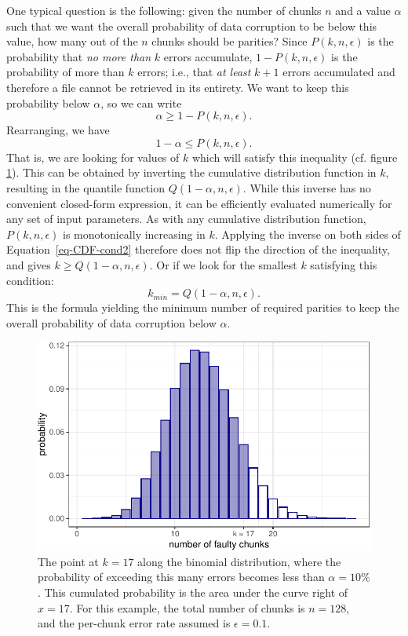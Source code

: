 \documentclass[manuscript,screen,review]{acmart}
\begin{document}
One typical question is the following: given the number of chunks $n$ and a value $\alpha$ such that we want the overall probability of data corruption to be below this value, how many out of the $n$ chunks should be parities? Since $P(k, n, \epsilon)$ is the probability that \emph{no more than} $k$ errors accumulate, $1 - P(k, n, \epsilon)$ is the probability of more than $k$ errors; i.e., that \emph{at least} $k + 1$ errors accumulated and therefore a file cannot be retrieved in its entirety. We want to keep this probability below $\alpha$, so we can write
\begin{equation}
  \alpha \ge 1 - P(k, n, \epsilon) .
  \label{eq-CDF-cond}
\end{equation}
Rearranging, we have
\begin{equation}
  1 - \alpha \le P(k, n, \epsilon) .
  \label{eq-CDF-cond2}
\end{equation}
That is, we are looking for values of $k$ which will satisfy this inequality (cf. figure \ref{fig:alpha}). This can be obtained by inverting the cumulative distribution function in $k$, resulting in the quantile function $Q(1 - \alpha, n, \epsilon)$. While this inverse has no convenient closed-form expression, it can be efficiently evaluated numerically for any set of input parameters. As with any cumulative distribution function, $P(k, n, \epsilon)$ is monotonically increasing in $k$. Applying the inverse on both sides of Equation~\ref{eq-CDF-cond2} therefore does not flip the direction of the inequality, and gives $k \ge Q(1 - \alpha, n, \epsilon)$. Or if we look for the smallest $k$ satisfying this condition:
\begin{equation}
  k_{\mathit{min}} = Q(1 - \alpha, n, \epsilon) .
  \label{eq-quantile-sol-n}
\end{equation}
This is the formula yielding the minimum number of required parities to keep the overall probability of data corruption below $\alpha$.

\begin{figure}[!ht]
  \centering
  \includegraphics[width=.7\textwidth]{figs/fig-alpha-1.pdf}
  \Description[]{}\caption{The point at $k=17$ along the binomial distribution, where the probability of exceeding this many errors becomes less than $\alpha = 10\%$. This cumulated probability is the area under the curve right of $x=17$. For this example, the total number of chunks is $n = 128$, and the per-chunk error rate assumed is $\epsilon = 0.1$.}
  \label{fig:alpha}
\end{figure}
\end{document}
